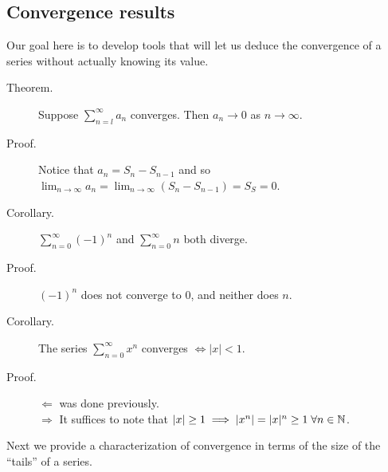 \documentclass[letterpaper,11pt]{article}
\begin{document}
\subsection{Convergence results}
Our goal here is to develop tools that will let us deduce the convergence
of a series without actually knowing its value.
\begin{description}
\item[Theorem.] Suppose $\sum_{n=l}^\infty a_n$ converges. Then $a_n\to0$
    as $n\to\infty$.

\item[Proof.] Notice that $a_n=S_n-S_{n-1}$ and so
  $\lim_{n\to\infty} a_n=\lim_{n\to\infty}(S_n-S_{n-1})=S_S=0$.

\item[Corollary.] $\sum_{n=0}^\infty (-1)^n$
    and $\sum_{n=0}^\infty n$ both diverge.

\item[Proof.] $(-1)^n$ does not converge to 0, and neither does $n$.


\item[Corollary.] The series $\sum_{n=0}^\infty x^n$ converges $\iff |x|<1$.
\item[Proof.] $\Leftarrow$ was done previously.\\
  $\Rightarrow$ It suffices to note that $|x|\ge1\implies|x^n|=|x|^n\ge1
  \;\forall n\in\mathbb{N}$.
\end{description}

Next we provide a characterization of convergence in terms of the size of the
``tails'' of a series.
\end{document}
